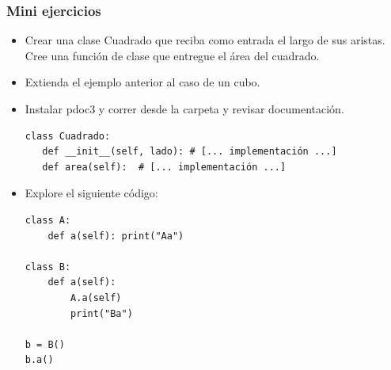 \documentclass[14pt,aspectratio=169,xcolor=dvipsnames]{beamer}
\begin{document}
\begin{frame}\frametitle{Mini ejercicios}
    \begin{footnotesize}
    \begin{itemize}
        \item Crear una clase Cuadrado que reciba como entrada el largo de sus aristas. Cree una función de clase que entregue el área del cuadrado.
        \item Extienda el ejemplo anterior al caso de un cubo.
        \item Instalar pdoc3 y correr  desde la carpeta y revisar documentación.
    \begin{verbatim}
class Cuadrado:
   def __init__(self, lado): # [... implementación ...]
   def area(self):  # [... implementación ...]
    \end{verbatim}
        \item Explore el siguiente código:
    \begin{verbatim}
class A:
    def a(self): print("Aa")

class B:
    def a(self):
        A.a(self)
        print("Ba")

b = B()
b.a()
        \end{verbatim}
    \end{itemize}
    \end{footnotesize}
\end{frame}
\end{document}
